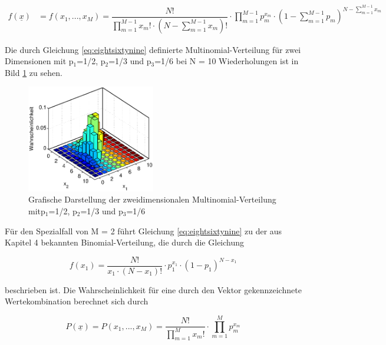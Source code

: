 \begin{equation}\label{eq:eightsixtynine}
\begin{split}
f\left(\underline{x}\right) & = f(x_{1} ,...,x_{M})=\dfrac{N!}{\prod _{m=1}^{M-1}x_{m} ! \cdot \left(N-\sum _{m=1}^{M-1}x_{m} \right)!} \cdot \prod _{m=1}^{M-1}p_{m}^{x_{m}} \cdot \left(1-\sum _{m=1}^{M-1}p_{m} \right)^{N-\sum _{m=1}^{M-1}x_{m}}
\end{split}
\end{equation}

\noindent Die durch Gleichung \eqref{eq:eightsixtynine} definierte Multinomial-Verteilung f\"{u}r zwei Dimensionen mit p$_{1}$=1/2, p$_{2}$=1/3 und p$_{3}$=1/6 bei N = 10 Wiederholungen ist in Bild \ref{fig:MultinomialVerteilung1} zu sehen.

\noindent 
\begin{figure}[H]
  \centerline{\includegraphics[width=0.5\textwidth]{Kapitel8/Bilder/image8}}
  \caption{Grafische Darstellung der zweidimensionalen Multinomial-Verteilung mitp$_{1}$=1/2, p$_{2}$=1/3 und p$_{3}$=1/6}
  \label{fig:MultinomialVerteilung1}
\end{figure}

\noindent F\"{u}r den Spezialfall von M = 2 f\"{u}hrt Gleichung \eqref{eq:eightsixtynine} zu der aus Kapitel 4 bekannten Binomial-Verteilung, die durch die Gleichung

\begin{equation}\label{eq:eightseventy}
f(x_{1})=\dfrac{N!}{x_{1} \cdot (N-x_{1} )!} \cdot p_{1}^{x_{1} } \cdot (1-p_{1})^{N-x_{1} }
\end{equation}

\noindent beschrieben ist. Die Wahrscheinlichkeit f\"{u}r eine durch den Vektor  gekennzeichnete Wertekombination berechnet sich durch

\begin{equation}\label{eq:eightseventyone}
P(\underline{x})=P(x_{1} ,...,x_{M})=\dfrac{N!}{\prod _{m=1}^{M}x_{m} !} \cdot \prod _{m=1}^{M}p_{m}^{x_{m} }
\end{equation}

